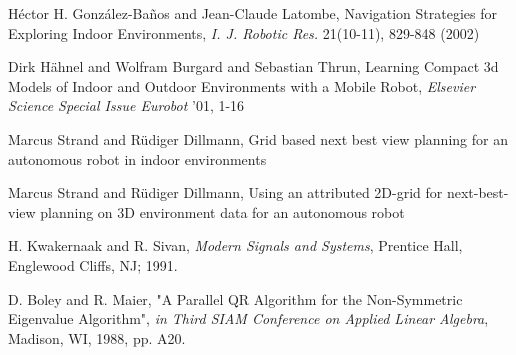 \documentclass[a4paper, 10pt, conference]{ieeeconf}      %
\begin{document}
\begin{thebibliography}{99}

H\'{e}ctor H. Gonz\'{a}lez-Ba\~{n}os and Jean-Claude Latombe, Navigation Strategies for Exploring Indoor Environments, {\it I. J. Robotic Res.} 21(10-11), 829-848 (2002)

Dirk H\"ahnel and Wolfram Burgard and Sebastian Thrun, Learning Compact 3d Models of Indoor and Outdoor Environments with a Mobile Robot, {\it Elsevier Science Special Issue Eurobot} '01, 1-16

Marcus Strand and Rüdiger Dillmann, Grid based next best view planning for an autonomous robot in indoor environments

Marcus Strand and Rüdiger Dillmann, Using an attributed 2D-grid for next-best-view planning on 3D environment data for an autonomous robot

H. Kwakernaak and R. Sivan, {\it Modern Signals and Systems}, Prentice Hall, Englewood Cliffs, NJ; 1991.

D. Boley and R. Maier, "A Parallel QR Algorithm for the Non-Symmetric Eigenvalue Algorithm", {\it in Third SIAM Conference on Applied Linear Algebra}, Madison, WI, 1988, pp. A20.

\end{thebibliography}
\end{document}
